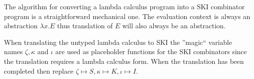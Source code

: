 \documentclass[11pt,oneside,a4paper]{report}
\begin{document}
The algorithm for converting a lambda calculus program into a SKI combinator program is a straightforward mechanical one.
The evaluation context is always an abstraction $\lambda x . E$ thus translation of $E$ will also always be an abstraction.
\begin{pcases}
\end{pcases}
When translating the untyped lambda calculus to SKI the ''magic`` variable names $\zeta, \kappa$ and $\iota$ are used as placeholder functions for the SKI combinators since the translation requires a lambda calculus form.
When the translation has been completed then replace $\zeta \mapsto S, \kappa \mapsto K, \iota \mapsto I$.
\end{document}
